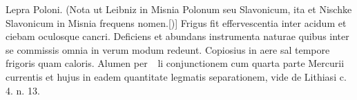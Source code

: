 Lepra Poloni.\protect{}
(Nota ut Leibniz in Misnia\protect{}
 Polonum seu Slavonicum, ita et Nischke Slavonicum in Misnia frequens nomen.[)]
\pend%
\pstart%
Frigus fit effervescentia inter acidum et ciebam oculosque cancri.
\pend
\pstart%
Deficiens et abundans instrumenta naturae quibus inter se commissis omnia in verum modum redeunt.
\pend%
\pstart%
Copiosius in aere sal tempore frigoris quam caloris.
\pend%
\pstart%
Alumen per \includegraphics[width=0.02\textwidth]{images/vitriol.pdf}li conjunctionem cum quarta parte Mercurii currentis et hujus in eadem quantitate legmatis separationem, vide
\protect{}
de Lithiasi c. 4. n. 13.%
